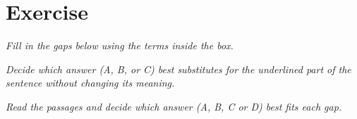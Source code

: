 \documentclass{article}
\begin{document}
\newpage
\section{Exercise}

\noindent \textit{Fill in the gaps below using the terms inside the box.}

%
%
%
%
%
%
%
%
%
%
%
%
%
%
%
%
%
%
%
%

\noindent \textit{Decide which answer (A, B, or C) best substitutes for the underlined part of the sentence without changing its meaning.}

%
%
%
%
%
%
%
%
%
%
%
%
%
%
%
%
%
%
%
%

\noindent \textit{Read the passages and decide which answer (A, B, C or D) best fits each gap.}

%
%
%
%
%
%
%
%
%
%
%
%
%
%
%
%
%
%
%
%
\end{document}
